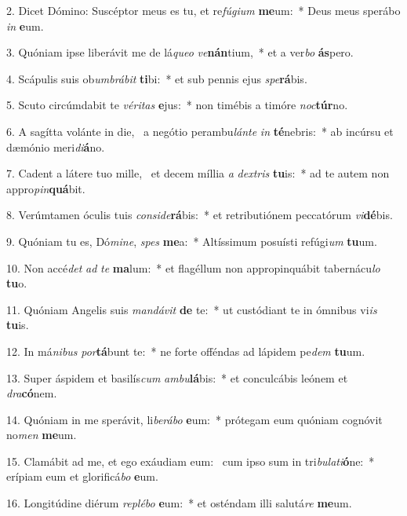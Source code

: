 2. Dicet Dómino: Suscéptor meus es tu, et re\textit{fú}\textit{gi}\textit{um} \textbf{me}um:~*  Deus meus sperábo \textit{in} \textbf{e}um.\

3. Quóniam ipse liberávit me de lá\textit{que}\textit{o} \textit{ve}\textbf{nán}tium,~*  et a ver\textit{bo} \textbf{ás}pero.\

4. Scápulis suis ob\textit{um}\textit{brá}\textit{bit} \textbf{ti}bi:~*  et sub pennis ejus \textit{spe}\textbf{rá}bis.\

5. Scuto circúmdabit te \textit{vé}\textit{ri}\textit{tas} \textbf{e}jus:~*  non timébis a timóre \textit{noc}\textbf{túr}no.\

6. A sagítta volánte in die, \dag\  a negótio perambu\textit{lán}\textit{te} \textit{in} \textbf{té}nebris:~*  ab incúrsu et dæmónio meri\textit{di}\textbf{á}no.\

7. Cadent a látere tuo mille, \dag\  et decem míllia \textit{a} \textit{dex}\textit{tris} \textbf{tu}is:~*  ad te autem non appro\textit{pin}\textbf{quá}bit.\

8. Verúmtamen óculis tuis \textit{con}\textit{si}\textit{de}\textbf{rá}bis:~*  et retributiónem peccatórum \textit{vi}\textbf{dé}bis.\

9. Quóniam tu es, Dó\textit{mi}\textit{ne}, \textit{spes} \textbf{me}a:~*  Altíssimum posuísti refúgi\textit{um} \textbf{tu}um.\

10. Non accé\textit{det} \textit{ad} \textit{te} \textbf{ma}lum:~*  et flagéllum non appropinquábit tabernácu\textit{lo} \textbf{tu}o.\

11. Quóniam Angelis suis \textit{man}\textit{dá}\textit{vit} \textbf{de} te:~*  ut custódiant te in ómnibus vi\textit{is} \textbf{tu}is.\

12. In má\textit{ni}\textit{bus} \textit{por}\textbf{tá}bunt te:~*  ne forte offéndas ad lápidem pe\textit{dem} \textbf{tu}um.\

13. Super áspidem et basilís\textit{cum} \textit{am}\textit{bu}\textbf{lá}bis:~*  et conculcábis leónem et \textit{dra}\textbf{có}nem.\

14. Quóniam in me sperávit, li\textit{be}\textit{rá}\textit{bo} \textbf{e}um:~*  prótegam eum quóniam cognóvit no\textit{men} \textbf{me}um.\

15. Clamábit ad me, et ego exáudiam eum: \dag\  cum ipso sum in tri\textit{bu}\textit{la}\textit{ti}\textbf{ó}ne:~*  erípiam eum et glorificá\textit{bo} \textbf{e}um.\

16. Longitúdine diérum \textit{re}\textit{plé}\textit{bo} \textbf{e}um:~*  et osténdam illi salutá\textit{re} \textbf{me}um.\

